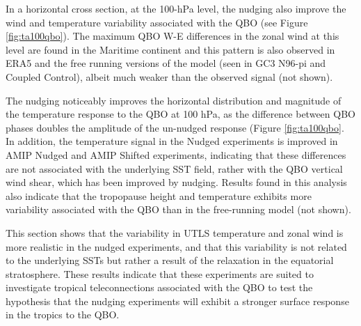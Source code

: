 In a horizontal cross section, at the 100-hPa level, the nudging also improve the wind and temperature variability associated with the QBO (see Figure \ref{fig:ta100qbo}). 
The maximum QBO W-E differences in the zonal wind at this level are found in the Maritime continent \citep{tegtmeier2020b} and this pattern is also observed in ERA5 and the free running versions of the model (seen in GC3 N96-pi and Coupled Control), albeit much weaker than the observed signal (not shown). 

The nudging noticeably improves the horizontal distribution and magnitude of the temperature response to the QBO at 100 hPa, as the difference between QBO phases doubles the amplitude of the un-nudged response (Figure \ref{fig:ta100qbo}. 
In addition, the temperature signal in the Nudged experiments is improved in AMIP Nudged and AMIP Shifted experiments, indicating that these differences are not associated with the underlying SST field, rather with the QBO vertical wind shear, which has been improved by nudging. 
Results found in this analysis also indicate that the tropopause height and temperature exhibits more variability associated with the QBO than in the free-running model (not shown). 

This section shows that the variability in UTLS temperature and zonal wind is more realistic in the nudged experiments, and that this variability is not related to the underlying SSTs but rather a result of the relaxation in the equatorial stratosphere. These results indicate that these experiments are suited to investigate tropical teleconnections associated with the QBO to test the hypothesis that the nudging experiments will exhibit a stronger surface response in the tropics to the QBO.

